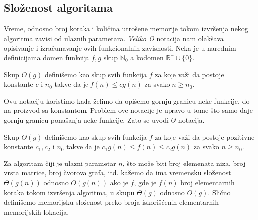 \subsection{Slo\v zenost algoritama}

Vreme, odnosno broj koraka i koli\v cina utro\v sene memorije tokom izvr\v senja nekog algoritma zavisi od ulaznih parametara. \textit{Veliko O} notacija nam olak\v sava opisivanje i izra\v cunavanje ovih funkcionalnih zavisnosti. Neka je u narednim definicijama domen funkcija $f, g$ skup $\mathbb{N}_0$ a kodomen $\mathbb{R}^{+} \cup \{ 0 \}$.

\begin{dfn}
Skup $O(g)$ defini\v semo kao skup svih funkcija $f$ za koje va\v zi da postoje konstante $c$ i $n_0$ takve da je $f(n) \leq c g(n)$ za svako $n \geq n_0$.
\end{dfn}

Ovu notaciju koristimo kada \v zelimo da opi\v semo gornju granicu neke funkcije, do na proizvod sa konstantom. Problem ove notacije je upravo u tome \v sto samo daje gornju granicu pona\v sanja neke funkcije. Zato se uvodi $\Theta$-notacija.

\begin{dfn}
Skup $\Theta(g)$ defini\v semo kao skup svih funkcija $f$ za koje va\v zi da postoje pozitivne konstante $c_1, c_2$ i $n_0$ takve da je $c_1 g(n) \leq f(n) \leq c_2 g(n)$ za svako $n \geq n_0$.
\end{dfn}

Za algoritam \v ciji je ulazni parametar $n$, \v sto mo\v ze biti broj elemenata niza, broj vrsta matrice, broj \v cvorova grafa, itd. ka\v zemo da ima vremensku slo\v zenost $\Theta(g(n))$ odnosno $O(g(n))$ ako je $f$, gde je $f(n)$ broj elementarnih koraka tokom izvr\v senja algoritma, u skupu $\Theta(g)$ odnosno $O(g)$. Sli\v cno defini\v semo memorijsku slo\v zenost preko broja iskori\v s\' cenih elementarnih memorijskih lokacija.

